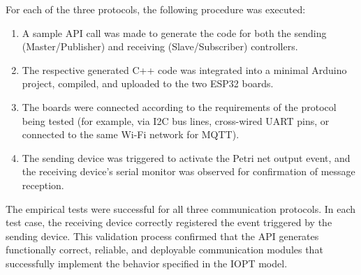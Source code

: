 For each of the three protocols, the following procedure was executed:
\begin{enumerate}
    \item A sample API call was made to generate the code for both the sending (Master/Publisher) and receiving (Slave/Subscriber) controllers.
    \item The respective generated C++ code was integrated into a minimal Arduino project, compiled, and uploaded to the two ESP32 boards.
    \item The boards were connected according to the requirements of the protocol being tested (for example, via I2C bus lines, cross-wired UART pins, or connected to the same Wi-Fi network for MQTT).
    \item The sending device was triggered to activate the Petri net output event, and the receiving device's serial monitor was observed for confirmation of message reception.
\end{enumerate}

The empirical tests were successful for all three communication protocols. In each test case, the receiving device correctly registered the event triggered by the sending device. This validation process confirmed that the API generates functionally correct, reliable, and deployable communication modules that successfully implement the behavior specified in the IOPT model.


